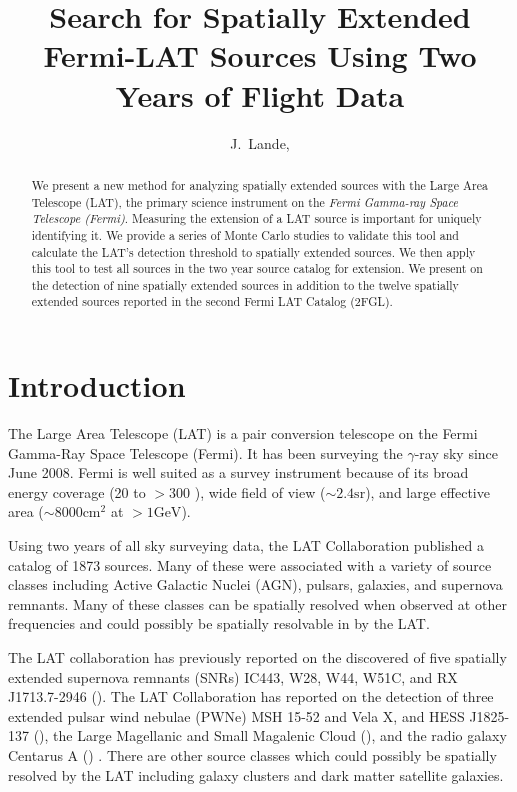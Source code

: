\documentclass[12pt,preprint]{aastex}
\newcommand{\mev}{\text{MeV}\xspace}
\newcommand{\gev}{\text{GeV}\xspace}
\newcommand{\sr}{\text{sr}\xspace}
\newcommand{\cm}{\text{cm}\xspace}
\begin{document}
\title{Search for Spatially Extended Fermi-LAT Sources Using Two Years of Flight
Data}

\author{
J.~Lande, 
}


\begin{abstract}
We present a new method for analyzing spatially extended sources with
the Large Area Telescope (LAT), the primary science instrument on the
{\em Fermi Gamma-ray Space Telescope (Fermi)}. Measuring the extension
of a LAT source is important for uniquely identifying it.  We provide
a series of Monte Carlo studies to validate this tool and calculate
the LAT's detection threshold to spatially extended sources.  We then
apply this tool to test all sources in the two year source catalog for
extension. We present on the detection of nine spatially extended sources
in addition to the twelve spatially extended sources reported in the
second Fermi LAT Catalog (2FGL).
\end{abstract}

\listoftodos

\section{Introduction}

The Large Area Telescope (LAT) is a pair conversion telescope on the
Fermi Gamma-Ray Space Telescope (Fermi). It has been surveying the $\gamma$-ray
sky since June 2008.  Fermi is well suited as a survey
instrument because of its broad energy coverage (20 \mev
to $>300$ \gev), wide field of view ($\sim 2.4 \sr$), and large effective
area ($\sim 8000 \cm^2$ at $>1 \gev$).

Using two years of all sky surveying data, the LAT Collaboration
published a catalog of 1873 \gev sources.
Many of these were associated
with a variety of source classes including Active Galactic Nuclei (AGN),
pulsars, galaxies, and supernova remnants.  Many of these classes can be
spatially resolved when observed at other frequencies and could possibly
be spatially resolvable in \gev by the LAT.

The LAT collaboration has previously reported on the discovered of
five spatially extended supernova remnants (SNRs) IC443, W28, W44,
W51C, and RX J1713.7-2946 (\cite{ic443,w28,w44,w51c,rx_j1713_lat}).
The LAT Collaboration has reported on the detection of three extended
pulsar wind nebulae (PWNe) MSH 15-52 and Vela X, and HESS J1825-137
(\cite{msh1552,velax,fermi_hess_j1825}), the Large Magellanic
and Small Magalenic Cloud (\cite{lmc,smc}), and the radio galaxy
Centarus A (\cite{cen_a_lat}) .  There are other source classes which
could possibly be spatially resolved by the LAT including galaxy clusters
and dark matter satellite galaxies.
\end{document}
